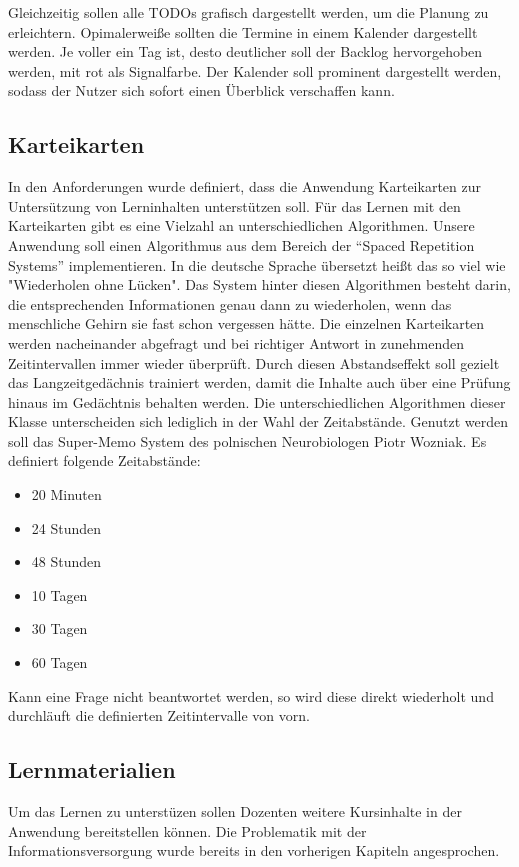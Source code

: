 Gleichzeitig sollen alle TODOs grafisch dargestellt werden, um die Planung zu erleichtern.
Opimalerweiße sollten die Termine in einem Kalender dargestellt werden.
Je voller ein Tag ist, desto deutlicher soll der Backlog hervorgehoben werden, mit rot als Signalfarbe. Der Kalender soll prominent dargestellt werden, sodass der Nutzer sich sofort einen Überblick verschaffen kann. 


\subsection{Karteikarten}
In den Anforderungen wurde definiert, dass die Anwendung Karteikarten zur Untersützung von Lerninhalten unterstützen soll.
Für das Lernen mit den Karteikarten gibt es eine Vielzahl an unterschiedlichen Algorithmen. Unsere Anwendung soll einen Algorithmus aus dem Bereich der \enquote{Spaced Repetition Systems} implementieren. In die deutsche Sprache übersetzt heißt das so viel wie "Wiederholen ohne Lücken". Das System hinter diesen Algorithmen besteht darin, die entsprechenden Informationen genau dann zu wiederholen, wenn das menschliche Gehirn sie fast schon vergessen hätte.\autocite[Vgl.][]{Tabibian3988} Die einzelnen Karteikarten werden nacheinander abgefragt und bei richtiger Antwort in zunehmenden Zeitintervallen immer wieder überprüft. Durch diesen Abstandseffekt soll gezielt das Langzeitgedächnis trainiert werden, damit die Inhalte auch über eine Prüfung hinaus im Gedächtnis behalten werden. Die unterschiedlichen Algorithmen dieser Klasse unterscheiden sich lediglich in der Wahl der Zeitabstände. 
Genutzt werden soll das Super-Memo System des polnischen Neurobiologen Piotr Wozniak. Es definiert folgende Zeitabstände:
\begin{itemize}
	\item 20 Minuten
	\item 24 Stunden
	\item 48 Stunden
	\item 10 Tagen
	\item 30 Tagen
	\item 60 Tagen
\end{itemize}  
Kann eine Frage nicht beantwortet werden, so wird diese direkt wiederholt und durchläuft die definierten Zeitintervalle von vorn. \autocite[Vgl.][]{BaileyuDavey}



\subsection{Lernmaterialien}
Um das Lernen zu unterstüzen sollen Dozenten weitere Kursinhalte in der Anwendung bereitstellen können. Die Problematik mit der Informationsversorgung wurde bereits in den vorherigen Kapiteln angesprochen.

